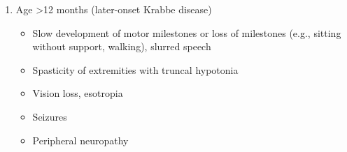\documentclass{scrartcl}
\begin{document}
\begin{enumerate}
\begin{enumerate}
\item Age >12 months (later-onset Krabbe disease)
\label{sec:org239385c}

\begin{itemize}
\item Slow development of motor milestones or loss of milestones (e.g.,
sitting without support, walking), slurred speech
\item Spasticity of extremities with truncal hypotonia
\item Vision loss, esotropia
\item Seizures
\item Peripheral neuropathy
\end{itemize}
\end{enumerate}
\end{enumerate}
\end{document}
